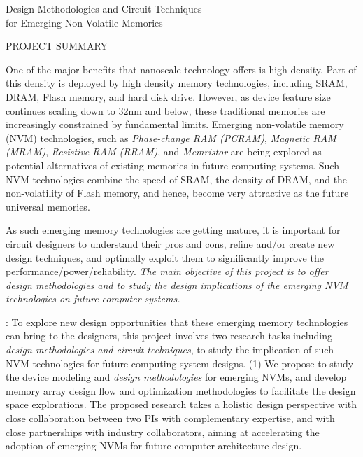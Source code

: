 \documentclass[11pt,letterpaper]{article}
\begin{document}
\begin{center}
{\Large Design Methodologies and Circuit Techniques}\\
\vspace*{0.2\baselineskip}
{\Large for Emerging Non-Volatile Memories}\\
\end{center}
\begin{center}
{\large  PROJECT SUMMARY} \\
\end{center}

\normalsize
One of the major benefits that nanoscale technology offers is high density. Part of this density is deployed by high density memory technologies, including SRAM, DRAM, Flash memory, and hard disk drive. However, as device feature size continues scaling down to 32nm and below, these traditional memories are increasingly constrained by fundamental limits. Emerging non-volatile memory (NVM) technologies, such as \textit{Phase-change RAM (PCRAM)}, \textit{Magnetic RAM (MRAM)},  \textit{Resistive RAM (RRAM)}, and \textit{Memristor} are being explored as potential alternatives of existing memories in future computing systems. Such NVM technologies combine the speed of SRAM, the density of DRAM, and the non-volatility of Flash memory, and hence, become very attractive as the future universal memories. 

As such emerging memory technologies are getting mature, it is important for circuit designers to understand their pros and cons, refine and/or create new design techniques, and optimally exploit them to significantly improve the performance/power/reliability. \textit{The main objective of this project is to offer design methodologies and to study the design implications of the emerging NVM technologies on future computer systems.}

\vspace*{-2mm} 
{}: 
To explore new design opportunities that these emerging memory technologies can bring to the designers,  this project involves two research tasks including \emph{design methodologies and circuit techniques}, to study the implication of such NVM technologies for future computing system designs.  (1) We propose to study the device modeling and \textit{design methodologies} for emerging NVMs, and develop memory array design flow and optimization methodologies to facilitate the design space explorations. The proposed research takes a holistic design perspective with close collaboration between two PIs with complementary expertise, and with close partnerships with industry collaborators, aiming at accelerating the adoption of emerging NVMs for future computer architecture design.
\end{document}
